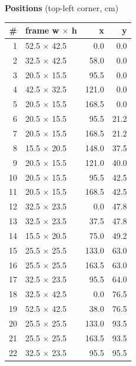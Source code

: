 \documentclass[a4paper,landscape,10pt]{article}
\begin{document}
\begin{minipage}[t]{0.25\textwidth}
\vspace{8pt}
{\bfseries Positions} (top-left corner, cm)\\[2pt]
\tiny
\begin{tabular}{@{}r l r r@{}}
\toprule
\# & frame w $\times$ h & x & y \\
\midrule
1 & 52.5 $\times$ 42.5 & 0.0 & 0.0 \\
2 & 32.5 $\times$ 42.5 & 58.0 & 0.0 \\
3 & 20.5 $\times$ 15.5 & 95.5 & 0.0 \\
4 & 42.5 $\times$ 32.5 & 121.0 & 0.0 \\
5 & 20.5 $\times$ 15.5 & 168.5 & 0.0 \\
6 & 20.5 $\times$ 15.5 & 95.5 & 21.2 \\
7 & 20.5 $\times$ 15.5 & 168.5 & 21.2 \\
8 & 15.5 $\times$ 20.5 & 148.0 & 37.5 \\
9 & 20.5 $\times$ 15.5 & 121.0 & 40.0 \\
10 & 20.5 $\times$ 15.5 & 95.5 & 42.5 \\
11 & 20.5 $\times$ 15.5 & 168.5 & 42.5 \\
12 & 32.5 $\times$ 23.5 & 0.0 & 47.8 \\
13 & 32.5 $\times$ 23.5 & 37.5 & 47.8 \\
14 & 15.5 $\times$ 20.5 & 75.0 & 49.2 \\
15 & 25.5 $\times$ 25.5 & 133.0 & 63.0 \\
16 & 25.5 $\times$ 25.5 & 163.5 & 63.0 \\
17 & 32.5 $\times$ 23.5 & 95.5 & 64.0 \\
18 & 32.5 $\times$ 42.5 & 0.0 & 76.5 \\
19 & 52.5 $\times$ 42.5 & 38.0 & 76.5 \\
20 & 25.5 $\times$ 25.5 & 133.0 & 93.5 \\
21 & 25.5 $\times$ 25.5 & 163.5 & 93.5 \\
22 & 32.5 $\times$ 23.5 & 95.5 & 95.5 \\
\bottomrule
\end{tabular}
\end{minipage}
\clearpage
\end{document}

